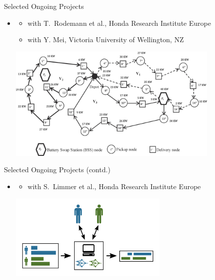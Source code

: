 \documentclass[aspectratio=1610]{beamer}
\begin{document}
\begin{frame}{Selected Ongoing Projects}
\begin{itemize}
  \itemsep3.5ex
  \item {}
  \begin{itemize}
    \item with T.~Rodemann et al., Honda Research Institute Europe
    \item with Y. Mei, Victoria University of Wellington, NZ
  \end{itemize}

  \includegraphics[width=0.8\textwidth]{graphics/darp-bss-example.jpg}
\end{itemize}
\end{frame}


\begin{frame}{Selected Ongoing Projects (contd.)}
\begin{itemize}
	\itemsep3.5ex
	\item {}
	\begin{itemize}
	\item with S.~Limmer et al., Honda Research Institute Europe
	\end{itemize}

	\includegraphics[width=0.6\textwidth]{graphics/coopsched.png}
\end{itemize}
\end{frame}
	
\end{document}
